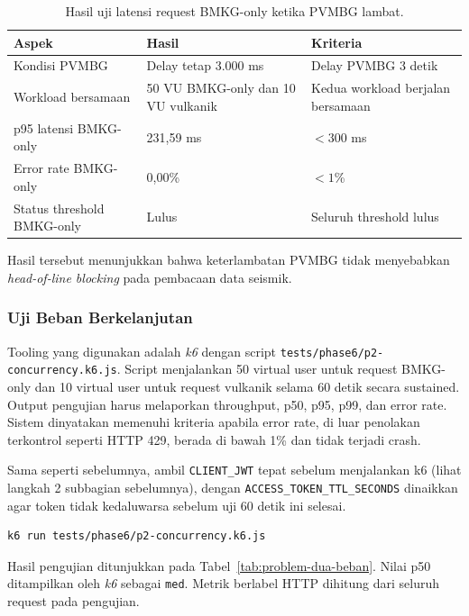 \begin{table}[H]
  \centering
  \small
  \begin{tabularx}{\textwidth}{p{3.6cm}p{3.4cm}X}
    \toprule
    Aspek & Hasil & Kriteria \\
    \midrule
    Kondisi PVMBG & Delay tetap 3.000 ms & Delay PVMBG 3 detik \\
    Workload bersamaan & 50 VU BMKG-only dan 10 VU vulkanik & Kedua workload berjalan bersamaan \\
    p95 latensi BMKG-only & 231,59 ms & $<300$ ms \\
    Error rate BMKG-only & 0,00\% & $<1$\% \\
    Status threshold BMKG-only & Lulus & Seluruh threshold lulus \\
    \bottomrule
  \end{tabularx}
  \caption{Hasil uji latensi request BMKG-only ketika PVMBG lambat.}
  \label{tab:problem-dua-latensi-bmkg}
\end{table}

Hasil tersebut menunjukkan bahwa keterlambatan PVMBG tidak menyebabkan
\textit{head-of-line blocking} pada pembacaan data seismik.

\subsubsection{Uji Beban Berkelanjutan}
Tooling yang digunakan adalah \textit{k6} dengan script
\texttt{tests/phase6/p2-concurrency.k6.js}. Script menjalankan 50 virtual user
untuk request BMKG-only dan 10 virtual user untuk request vulkanik selama 60
detik secara sustained. Output pengujian harus melaporkan throughput,
p50, p95, p99, dan error rate. Sistem dinyatakan memenuhi kriteria apabila
error rate, di luar penolakan terkontrol seperti HTTP 429, berada di bawah 1\%
dan tidak terjadi crash.

Sama seperti sebelumnya, ambil \texttt{CLIENT\_JWT} tepat sebelum menjalankan k6
(lihat langkah 2 subbagian sebelumnya), dengan \texttt{ACCESS\_TOKEN\_TTL\_SECONDS}
dinaikkan agar token tidak kedaluwarsa sebelum uji 60 detik ini selesai.

\begin{lstlisting}[style=code,language=bash]
k6 run tests/phase6/p2-concurrency.k6.js
\end{lstlisting}

Hasil pengujian ditunjukkan pada Tabel~\ref{tab:problem-dua-beban}. Nilai p50
ditampilkan oleh \textit{k6} sebagai \texttt{med}. Metrik berlabel
HTTP dihitung dari seluruh request pada pengujian.

